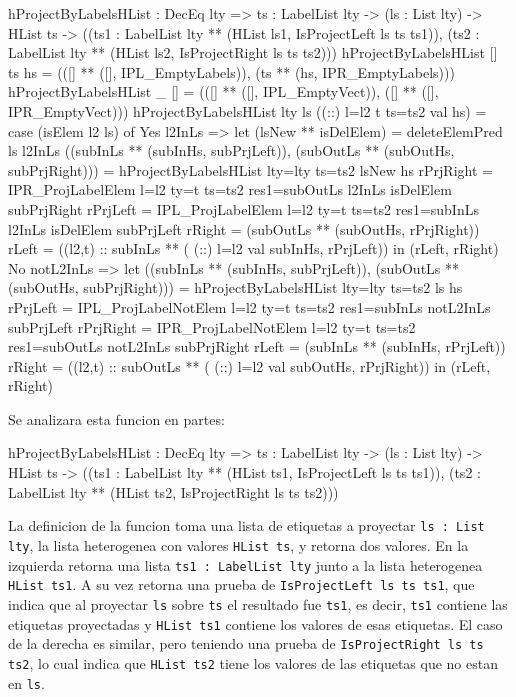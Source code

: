 \begin{code}
hProjectByLabelsHList : DecEq lty => 
  {ts : LabelList lty} -> (ls : List lty) -> 
  HList ts ->     
  ((ts1 : LabelList lty ** 
    (HList ls1, IsProjectLeft ls ts ts1)),
  (ts2 : LabelList lty ** 
    (HList ls2, IsProjectRight ls ts ts2)))
hProjectByLabelsHList [] {ts} hs = 
  (([] ** ([], IPL_EmptyLabels)),
  (ts ** (hs, IPR_EmptyLabels)))
hProjectByLabelsHList _ [] =
  (([] ** ([], IPL_EmptyVect)),
  ([] ** ([], IPR_EmptyVect)))
hProjectByLabelsHList {lty} ls ((::) {l=l2} {t} 
    {ts=ts2} val hs) =
  case (isElem l2 ls) of
    Yes l2InLs =>
      let
        (lsNew ** isDelElem) = deleteElemPred ls l2InLs
        ((subInLs ** (subInHs, subPrjLeft)), 
          (subOutLs ** (subOutHs, subPrjRight))) =
          hProjectByLabelsHList {lty=lty} {ts=ts2} lsNew hs
        rPrjRight = IPR_ProjLabelElem {l=l2} {ty=t} {ts=ts2} 
          {res1=subOutLs} l2InLs isDelElem subPrjRight
        rPrjLeft = IPL_ProjLabelElem {l=l2} {ty=t} {ts=ts2} 
          {res1=subInLs} l2InLs isDelElem subPrjLeft
        rRight = (subOutLs ** (subOutHs, rPrjRight))
        rLeft = ((l2,t) :: subInLs ** (
          (::) {l=l2} val subInHs, rPrjLeft))
       in
         (rLeft, rRight)
    No notL2InLs =>
      let
        ((subInLs ** (subInHs, subPrjLeft)), 
          (subOutLs ** (subOutHs, subPrjRight))) =
          hProjectByLabelsHList {lty=lty} {ts=ts2} ls hs
        rPrjLeft = IPL_ProjLabelNotElem {l=l2} {ty=t} {ts=ts2} 
          {res1=subInLs} notL2InLs subPrjLeft
        rPrjRight = IPR_ProjLabelNotElem {l=l2} {ty=t} {ts=ts2} 
          {res1=subOutLs} notL2InLs subPrjRight
        rLeft = (subInLs ** (subInHs, rPrjLeft))
        rRight = ((l2,t) :: subOutLs ** (
          (::) {l=l2} val subOutHs, rPrjRight))
      in
        (rLeft, rRight)
\end{code}

Se analizara esta funcion en partes:

\begin{code}
hProjectByLabelsHList : DecEq lty => {ts : LabelList lty} -> 
  (ls : List lty) -> HList ts ->     
  ((ts1 : LabelList lty ** 
    (HList ts1, IsProjectLeft ls ts ts1)),
  (ts2 : LabelList lty ** 
    (HList ts2, IsProjectRight ls ts ts2)))
\end{code}

La definicion de la funcion toma una lista de etiquetas a proyectar \texttt{ls : List lty}, la lista heterogenea con valores \texttt{HList ts}, y retorna dos valores. En la izquierda retorna una lista \texttt{ts1 : LabelList lty} junto a la lista heterogenea \texttt{HList ts1}. A su vez retorna una prueba de \texttt{IsProjectLeft ls ts ts1}, que indica que al proyectar \texttt{ls} sobre \texttt{ts} el resultado fue \texttt{ts1}, es decir, \texttt{ts1} contiene las etiquetas proyectadas y \texttt{HList ts1} contiene los valores de esas etiquetas.
El caso de la derecha es similar, pero teniendo una prueba de \texttt{IsProjectRight ls ts ts2}, lo cual indica que \texttt{HList ts2} tiene los valores de las etiquetas que no estan en \texttt{ls}.

